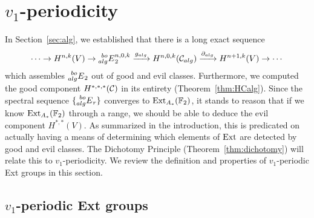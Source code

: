 
\section{$v_1$-periodicity}\label{sec:v1}

In Section~\ref{sec:alg}, we established that there is a long exact sequence
\begin{equation}
 \cdots \rightarrow H^{n,k}(V) \rightarrow \prescript{bo}{alg}{E}_2^{n,0,k} \xrightarrow{g_{alg}} H^{n,0,k}(\mathcal{C}_{alg}) \xrightarrow{\partial_{alg}} H^{n+1,k}(V) \rightarrow \cdots
\end{equation}
which assembles $\prescript{bo}{alg}{E}_2$ out of good and evil classes. 
Furthermore, we computed the good component $H^{*,*,*}(\mathcal{C})$ in its entirety (Theorem~\ref{thm:HCalg}).  Since the spectral sequence $\{\prescript{bo}{alg}{E}_r\}$ converges to $\operatorname{Ext}_{A_*}(\mathbb{F}_2)$, it stands to reason that if we know $\operatorname{Ext}_{A_*}(\mathbb{F}_2)$ through a range, we should be able to deduce the evil component $H^{*,*}(V)$.  As summarized in the introduction, this is predicated on actually having a means of determining which elements of $\operatorname{Ext}$ are detected by good and evil classes.  The Dichotomy Principle (Theorem~\ref{thm:dichotomy}) will relate this to $v_1$-periodicity.  We review the definition and properties of $v_1$-periodic Ext groups in this section.


\begin{comment}
We therefore endeavor to understand the map $g_{alg}$ in this section.  The stategy will be to consider the $v_1$-periodic $\bo$-Mahowald spectral sequence:
$$ v_1^{-1}\E{bo}{alg}_2^{n,s,t} \Rightarrow v_1^{-1}\Ext^{n+s, t}_{A_*}(\FF_2). $$
The significance of this is encoded in the commutative diagram
$$ 
\xymatrix@C+1em{
\E{bo}{alg}_2^{n,0,k} \ar[r]^{g_{alg}} \ar[d] & 
H^{n,0,k}(\mc{C}_{alg}) \ar@{^{(}->}[d] \\
v_1^{-1} \! \E{bo}{alg}_2^{n,0,k} \ar[r]^{v_1^{-1}g_{alg}}_\cong & 
 H^{n,0,k}(v_1^{-1}\mc{C}_{alg})
}
$$ 
We will prove (1) the right homomorphism is an injection (Lemma~\ref{lem:v1HCalg}), and (2) the bottom homomorphism is an isomorphism (Lemma~\ref{lem:v1E2boalg}), as depicted.  This is sufficient to determine $g_{alg}$.
\end{comment}



\subsection*{$v_1$-periodic Ext groups}

